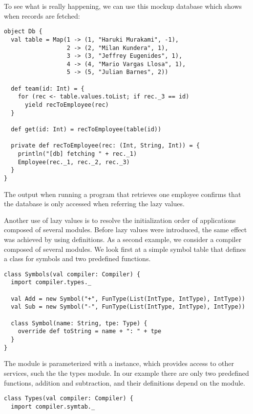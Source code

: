 {To see what is really happening, we can use this mockup
database which shows when records are fetched:
\begin{lstlisting}
object Db {
  val table = Map(1 -> (1, "Haruki Murakami", -1),
                  2 -> (2, "Milan Kundera", 1),
                  3 -> (3, "Jeffrey Eugenides", 1),
                  4 -> (4, "Mario Vargas Llosa", 1),
                  5 -> (5, "Julian Barnes", 2))

  def team(id: Int) = {
    for (rec <- table.values.toList; if rec._3 == id)
      yield recToEmployee(rec)
  }

  def get(id: Int) = recToEmployee(table(id))

  private def recToEmployee(rec: (Int, String, Int)) = {
    println("[db] fetching " + rec._1)
    Employee(rec._1, rec._2, rec._3)
  }
}
\end{lstlisting}
The output when running a program that retrieves one employee 
confirms that the database is only accessed when referring  the lazy
values.

Another use of lazy values is to resolve the
initialization order of applications composed of several
modules. Before lazy values were introduced, the same effect was
achieved by using \lstinline@object@ definitions. As a second example,
we consider a compiler composed of several modules. We look first at a
simple symbol table that defines a class for symbols and two
predefined functions.
\begin{lstlisting}
class Symbols(val compiler: Compiler) {
  import compiler.types._

  val Add = new Symbol("+", FunType(List(IntType, IntType), IntType))
  val Sub = new Symbol("-", FunType(List(IntType, IntType), IntType))

  class Symbol(name: String, tpe: Type) {
    override def toString = name + ": " + tpe
  }
}
\end{lstlisting}
The \lstinline@symbols@ module is parameterized with a \lstinline@Compiler@
instance, which provides access to other services, such the the types
module. In our example there are only two predefined functions,
addition and subtraction, and their definitions depend on the \lstinline@types@
module.
\begin{lstlisting}
class Types(val compiler: Compiler) {
  import compiler.symtab._


\end{lstlisting}}
